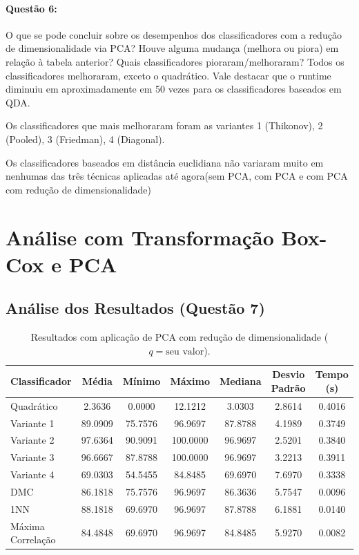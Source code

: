 \documentclass[a4paper, 12pt]{article}
\begin{document}
\paragraph{Questão 6:} O que se pode concluir sobre os desempenhos dos classificadores com a redução de dimensionalidade via PCA? Houve alguma mudança (melhora ou piora) em relação à tabela anterior? Quais classificadores pioraram/melhoraram?
Todos os classificadores melhoraram, exceto o quadrático. Vale destacar que o runtime diminuiu em aproximadamente
em 50 vezes para os classificadores baseados em QDA.

Os classificadores que mais melhoraram foram as variantes 1 (Thikonov), 2 (Pooled), 3 (Friedman), 4 (Diagonal).

Os classificadores baseados em distância euclidiana não variaram muito em
nenhumas das três técnicas aplicadas até agora(sem PCA, com PCA e com PCA com redução de dimensionalidade)


\section{Análise com Transformação Box-Cox e PCA}
\subsection*{Análise dos Resultados (Questão 7)}


\begin{table}[H]
    \centering
    \caption{Resultados com aplicação de PCA com redução de dimensionalidade ($q = \text{seu valor}$).}
    \label{tab:pca_com_reducao}
    \begin{tabular}{lcccccc}
        \toprule
        \textbf{Classificador} & \textbf{Média} & \textbf{Mínimo} & \textbf{Máximo} & \textbf{Mediana} & \textbf{Desvio Padrão} & \textbf{Tempo (s)} \\
        \midrule
        Quadrático         & 2.3636   & 0.0000   & 12.1212   & 3.0303   & 2.8614         & 0.4016\\
        Variante 1         & 89.0909  & 75.7576  & 96.9697   & 87.8788  & 4.1989         & 0.3749\\
        Variante 2         & 97.6364  & 90.9091  & 100.0000  & 96.9697  & 2.5201         & 0.3840\\
        Variante 3         & 96.6667  & 87.8788  & 100.0000  & 96.9697  & 3.2213         & 0.3911\\
        Variante 4         & 69.0303  & 54.5455  & 84.8485   & 69.6970  & 7.6970         & 0.3338\\
        DMC                & 86.1818  & 75.7576  & 96.9697   & 86.3636  & 5.7547         & 0.0096\\
        1NN                & 88.1818  & 69.6970  & 96.9697   & 87.8788  & 6.1881         & 0.0140\\
        Máxima Correlação  & 84.4848  & 69.6970  & 96.9697   & 84.8485  & 5.9270         & 0.0082\\
        \bottomrule
    \end{tabular}
\end{table}
\end{document}
